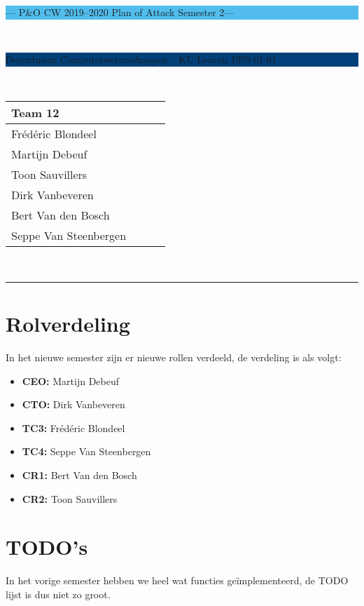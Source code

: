 \documentclass[a4paper,11pt]{article}
\begin{document}
\noindent
\colorbox[HTML]{52BDEC}{\bfseries\parbox{\textwidth}{\centering\large
  --- P\&O CW 2019--2020 Plan of Attack Semester 2---
}}
\\[-1mm]
\colorbox[HTML]{00407A}{\bfseries\color{white}\parbox{\textwidth}{
  Department Computerwetenschappen -- KU Leuven
  \hfill
  \today
}}
\\

\smallskip

\noindent

\begin{tabular}{*4l}
\toprule
\multicolumn{2}{l}{\large\textbf{Team 12}} \\
\midrule
Frédéric Blondeel &  \\
Martijn Debeuf &  \\
Toon Sauvillers &  \\ %
Dirk Vanbeveren &  \\
Bert Van den Bosch &  \\ 
Seppe Van Steenbergen &  \\

\bottomrule
\hline
\end{tabular}\\
\noindent


{\color[HTML]{52BDEC} \rule{\linewidth}{1mm} }
\tableofcontents

\section{Rolverdeling}
In het nieuwe semester zijn er nieuwe rollen verdeeld, de verdeling is als volgt:
\begin{multicols}{2}
\begin{itemize}
	\item {\bf CEO:} Martijn Debeuf
	\item {\bf CTO:} Dirk Vanbeveren
	\item {\bf TC3:} Frédéric Blondeel
	\item {\bf TC4:} Seppe Van Steenbergen
	\item {\bf CR1:} Bert Van den Bosch
	\item {\bf CR2:} Toon Sauvillers
\end{itemize}
\end{multicols}
\section{TODO's}
In het vorige semester hebben we heel wat functies geïmplementeerd, de TODO lijst is dus niet zo groot.
\end{document}
